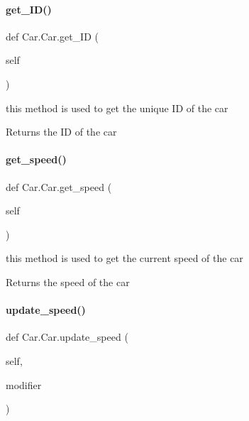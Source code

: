 \paragraph{\texorpdfstring{get\_ID()}{get\_ID()}}
{\footnotesize\ttfamily def Car.\+Car.\+get\+\_\+\+ID (\begin{DoxyParamCaption}\item[{}]{self }\end{DoxyParamCaption})}



this method is used to get the unique ID of the car 

\begin{DoxyReturn}{Returns}
the ID of the car 
\end{DoxyReturn}
\mbox{\label{class_car_1_1_car_a1f2c5f15b6bffe9e644da70b1b9136ae}} 
\paragraph{\texorpdfstring{get\_speed()}{get\_speed()}}
{\footnotesize\ttfamily def Car.\+Car.\+get\+\_\+speed (\begin{DoxyParamCaption}\item[{}]{self }\end{DoxyParamCaption})}



this method is used to get the current speed of the car 

\begin{DoxyReturn}{Returns}
the speed of the car 
\end{DoxyReturn}
\mbox{\label{class_car_1_1_car_ac15a58819007bcae44278a783105d7e9}} 
\paragraph{\texorpdfstring{update\_speed()}{update\_speed()}}
{\footnotesize\ttfamily def Car.\+Car.\+update\+\_\+speed (\begin{DoxyParamCaption}\item[{}]{self,  }\item[{}]{modifier }\end{DoxyParamCaption})}



